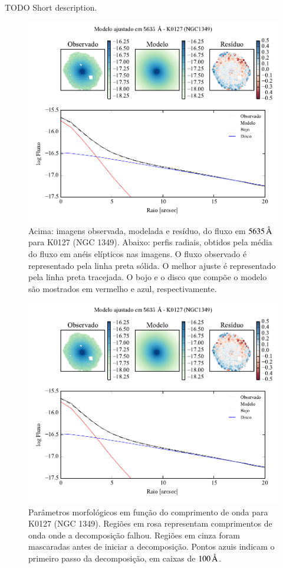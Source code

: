 TODO Short description.

\begin{figure}
	\includegraphics[page=1]{figuras-decomp/K0127_sample006a}
	\caption[Ajuste morfológico em $5635\,\angstrom$ de K0127 (NGC 1349)]
	{Acima: imagens observada, modelada e resíduo, do fluxo em $5635\,\angstrom$
	para K0127 (NGC 1349). Abaixo: perfis radiais, obtidos pela média do fluxo em
	anéis elípticos nas imagens. O fluxo observado é representado pela linha preta
	sólida. O melhor ajuste é representado pela linha preta tracejada. O bojo e o
	disco que compõe o modelo são mostrados em vermelho e azul, respectivamente.}
	\label{fig:decompRadprof:K0127}
\end{figure}

\begin{figure}
	\includegraphics[page=2]{figuras-decomp/K0127_sample006a}
	\caption[Parâmetros morfológicos em função do comprimento de onda de K0127
	(NGC 1349)]
	{Parâmetros morfológicos em função do comprimento de onda para
	K0127 (NGC 1349). Regiões em rosa representam comprimentos de onda onde a
	decomposição falhou. Regiões em cinza foram mascaradas antes de iniciar a
	decomposição. Pontos azuis indicam o primeiro passo da decomposição, em caixas
	de $100\,\text{\normalfont\AA}$.}
	\label{fig:decompParams:K0127}
\end{figure}

